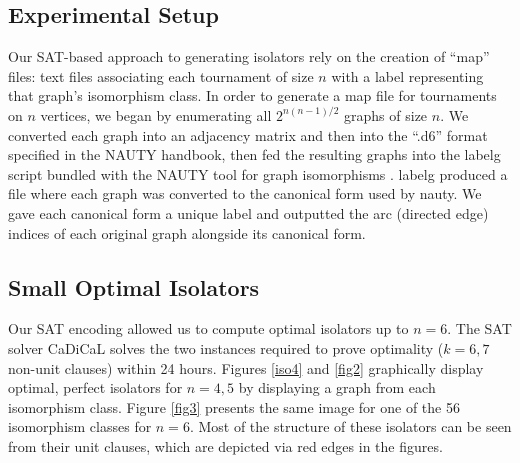 \documentclass[conference]{IEEEtran}
\begin{document}
\subsection{Experimental Setup}
Our SAT-based approach to generating isolators rely on the creation of ``map'' files: text files associating each tournament of size $n$ with a label representing that graph's isomorphism class. In order to generate a map file for tournaments on $n$ vertices, we began by enumerating all $2^{n(n-1)/2}$ graphs of size $n$. We converted each graph into an adjacency matrix and then into the ``.d6'' format specified in the NAUTY handbook, then fed the resulting graphs into the labelg script bundled with the NAUTY tool for graph isomorphisms \cite{ref_nauty}. labelg produced a file where each graph was converted to the canonical form used by nauty. We gave each canonical form a unique label and outputted the arc (directed edge) indices of each original graph alongside its canonical form. 


\subsection{Small Optimal Isolators}

Our SAT encoding allowed us to compute optimal isolators up to $n=6$. The SAT solver CaDiCaL \cite{cadical} solves the two instances required to prove optimality ($k=6,7$ non-unit clauses) within 24 hours. Figures \ref{iso4} and \ref{fig2} graphically display optimal, perfect isolators for $n=4,5$ by displaying a graph from each isomorphism class. Figure \ref{fig3} presents the same image for one of the 56 isomorphism classes for $n=6$. Most of the structure of these isolators can be seen from their unit clauses, which are depicted via red edges in the figures. 
\end{document}
